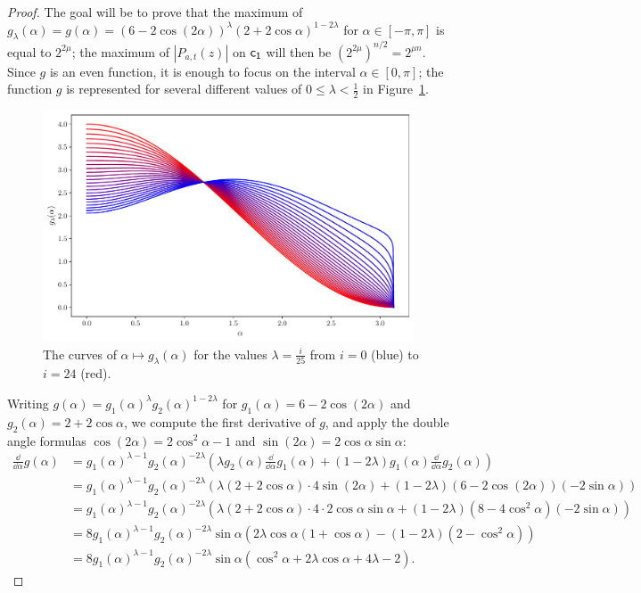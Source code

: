 \documentclass[11pt]{llncs}
\begin{document}
\begin{proof}
    The goal will be to prove that the maximum of $g_\lambda(\alpha)=g(\alpha)=(6-2\cos(2\alpha))^\lambda(2+2\cos\alpha)^{1-2\lambda}$ for $\alpha\in[-\pi,\pi]$ is equal to $2^{2\mu}$; the maximum of $|P_{a,t}(z)|$ on $\mathsf{c_1}$ will then be $\left(2^{2\mu}\right)^{n/2}=2^{\mu n}$. Since $g$ is an even function, it is enough to focus on the interval $\alpha\in[0,\pi]$; the function $g$ is represented for several different values of $0\leq\lambda<\frac 12$ in Figure~\ref{fig:family_curves_g}.

    \begin{figure}
    	\centering
    	\includegraphics[width=11cm]{family_curves_g.pdf}
    	\caption{The curves of $\alpha\mapsto g_\lambda(\alpha)$ for the values $\lambda=\frac{i}{25}$ from $i=0$ (blue) to $i=24$ (red).}
    	\label{fig:family_curves_g}
    \end{figure}
    
    Writing $g(\alpha)=g_1(\alpha)^{\lambda}g_2(\alpha)^{1-2\lambda}$ for $g_1(\alpha)=6-2\cos(2\alpha)$ and $g_2(\alpha)=2+2\cos\alpha$, we compute the first derivative of $g$, and apply the double angle formulas $\cos(2\alpha)=2\cos^2\alpha-1$ and $\sin(2\alpha)=2\cos\alpha\sin\alpha$:
    \begin{align*}
         \frac{\dd}{\dd\alpha}g(\alpha)&=g_1(\alpha)^{\lambda-1}g_2(\alpha)^{-2\lambda}\left(\lambda g_2(\alpha)\frac{\dd}{\dd\alpha}g_1(\alpha)+(1-2\lambda)g_1(\alpha)\frac{\dd}{\dd\alpha}g_2(\alpha)\right)\\
         &=g_1(\alpha)^{\lambda-1}g_2(\alpha)^{-2\lambda}\left(\lambda(2+2\cos\alpha)\cdot4\sin(2\alpha)+(1-2\lambda)(6-2\cos(2\alpha))(-2\sin\alpha)\right)\\
         &=g_1(\alpha)^{\lambda-1}g_2(\alpha)^{-2\lambda}\left(\lambda(2+2\cos\alpha)\cdot4\cdot2\cos\alpha\sin\alpha+(1-2\lambda)\left(8-4\cos^2\alpha\right)(-2\sin\alpha)\right)\\
         &=8g_1(\alpha)^{\lambda-1}g_2(\alpha)^{-2\lambda}\sin\alpha\left(2\lambda \cos\alpha(1+\cos\alpha)-(1-2\lambda)\left(2-\cos^2\alpha\right)\right)\\
         &=8g_1(\alpha)^{\lambda-1}g_2(\alpha)^{-2\lambda}\sin\alpha\left(\cos^2\alpha+2\lambda\cos\alpha+4\lambda-2\right).
    \end{align*}
    

\end{proof}
\end{document}
